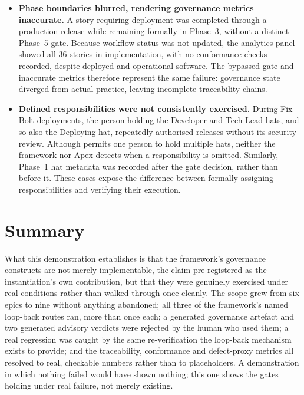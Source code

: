 \begin{itemize}[leftmargin=0.6cm, itemsep=0.4em]
\item \textbf{Phase boundaries blurred, rendering governance metrics inaccurate.} A story requiring deployment was completed through a production release while remaining formally in Phase~3, without a distinct Phase~5 gate. Because workflow status was not updated, the analytics panel showed all 36 stories in implementation, with no conformance checks recorded, despite deployed and operational software. The bypassed gate and inaccurate metrics therefore represent the same failure: governance state diverged from actual practice, leaving incomplete traceability chains.

\item \textbf{Defined responsibilities were not consistently exercised.} During Fix-Bolt deployments, the person holding the Developer and Tech Lead hats, and so also the Deploying hat, repeatedly authorised releases without its security review. Although  permits one person to hold multiple hats, neither the framework nor Apex detects when a responsibility is omitted. Similarly, Phase~1 hat metadata was recorded after the gate decision, rather than before it. These cases expose the difference between formally assigning responsibilities and verifying their execution.

\end{itemize}
\section{Summary}
\label{sec:demo_summary}

What this demonstration establishes is that the framework's governance constructs are not merely implementable, the claim  pre-registered as the instantiation's own contribution, but that they were genuinely exercised under real conditions rather than walked through once cleanly. The scope grew from six epics to nine without anything abandoned; all three of the framework's named loop-back routes ran, more than once each; a generated governance artefact and two generated advisory verdicts were rejected by the human who used them; a real regression was caught by the same re-verification the loop-back mechanism exists to provide; and the traceability, conformance and defect-proxy metrics all resolved to real, checkable numbers rather than to placeholders. A demonstration in which nothing failed would have shown nothing; this one shows the gates holding under real failure, not merely existing.

